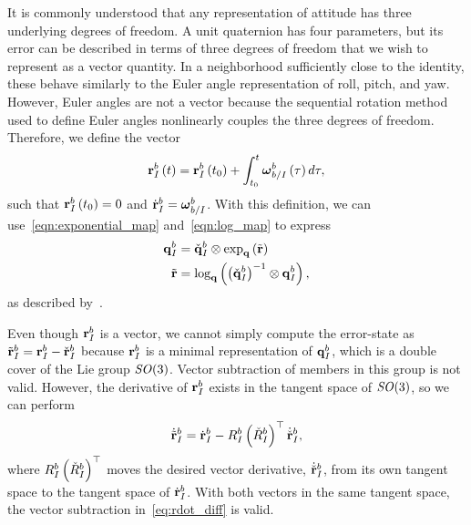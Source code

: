 It is commonly understood that any representation of attitude has three
underlying degrees of freedom.  A unit quaternion has four parameters, but its
error can be described in terms of three degrees of freedom that we wish
to represent as a vector quantity.   In a neighborhood sufficiently close to the
identity,
these behave similarly to the Euler angle representation of roll, pitch,
and yaw. However, Euler angles are not a vector because the sequential rotation
method used to define Euler angles nonlinearly couples the three degrees of
freedom. Therefore, we define the vector
\begin{equation}
  \label{eq:r_def}
  \boldsymbol{\mathrm{r}}_I^b\left(t\right)=\boldsymbol{\mathrm{r}}_I^b\left(t_0\right)+\int_{t_{0}}^{t}\boldsymbol{\mathrm{\omega}}_{b/I}^{b}\left(\tau\right)d\tau,
\end{equation}
such that $\boldsymbol{\mathrm{r}}_I^b\left(t_0\right) = 0$ and $\dot{\boldsymbol{\mathrm{r}}}_I^b = \boldsymbol{\mathrm{\omega}}_{b/I}^{b}$.
With this definition, we can use~\eqref{eqn:exponential_map}
and~\eqref{eqn:log_map} to express
\begin{align}
  \label{eq:q_des}
  \boldsymbol{\mathrm{q}}_{I}^{b} &= \check{\boldsymbol{\mathrm{q}}}_{I}^{b} \otimes \exp_{\boldsymbol{\mathrm{q}}} \left(\tilde{\boldsymbol{\mathrm{r}}}\right) \\
  \tilde{\boldsymbol{\mathrm{r}}} &= \log_{\boldsymbol{\mathrm{q}}} \left(\left(\check{\boldsymbol{\mathrm{q}}}_{I}^{b}\right)^{-1} \otimes
    \boldsymbol{\mathrm{q}}_{I}^{b}\right),
\end{align}
as described by~\cite{hertzberg2013integrating}.

Even though $\boldsymbol{\mathrm{r}}_I^b$ is a vector, we cannot simply compute the error-state
as $\tilde{\boldsymbol{\mathrm{r}}}_I^b=\boldsymbol{\mathrm{r}}_I^b-\check{\boldsymbol{\mathrm{r}}}_I^b$ because $\boldsymbol{\mathrm{r}}_I^b$
is a minimal representation of $\boldsymbol{\mathrm{q}}_I^b$, which is a double cover of the
Lie group $\SO\mathopen{}\mathclose\bgroup\left(3\aftergroup\egroup\right)$. %
Vector subtraction of members in this group is not valid.
However, the derivative of $\boldsymbol{\mathrm{r}}_I^b$ exists in the tangent space of $\SO\mathopen{}\mathclose\bgroup\left(3\aftergroup\egroup\right)$, so we can perform
\begin{equation}
\label{eq:rdot_diff}
\dot{\tilde{\boldsymbol{\mathrm{r}}}}_I^b=\dot{\boldsymbol{\mathrm{r}}}_I^b-R_I^b\left(\check{R}_I^b\right)^{\top}\dot{\check{\boldsymbol{\mathrm{r}}}}_I^b,
\end{equation}
where $R_I^b\left(\check{R}_I^b\right)^{\top}$ moves the desired vector
derivative, $\dot{\check{\boldsymbol{\mathrm{r}}}}_I^b$, from its own tangent space to the tangent space of $\dot{\boldsymbol{\mathrm{r}}}_I^b$.
With both vectors in the same tangent space, the vector subtraction in~\eqref{eq:rdot_diff} is valid.

